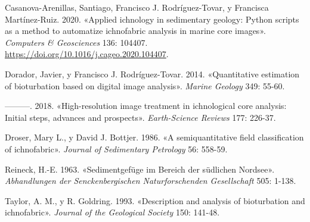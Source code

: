 \documentclass[
  10pt,
]{article}
\newlength{\cslhangindent}
\newlength{\cslentryspacingunit} %
\newenvironment{CSLReferences}[2] %
 {%
  \setlength{\parindent}{0pt}
  \ifodd #1
  \let\oldpar\par
  \def\par{\hangindent=\cslhangindent\oldpar}
  \fi
  \setlength{\parskip}{#2\cslentryspacingunit}
 }%
 {}
\begin{document}
\hypertarget{refs}{}
\begin{CSLReferences}{1}{0}
\leavevmode{}%
Casanova-Arenillas, Santiago, Francisco J. Rodríguez-Tovar, y Francisca
Martínez-Ruiz. 2020. {«Applied ichnology in sedimentary geology: Python
scripts as a method to automatize ichnofabric analysis in marine core
images»}. \emph{Computers \& Geosciences} 136: 104407.
\url{https://doi.org/10.1016/j.cageo.2020.104407}.

\leavevmode{}%
Dorador, Javier, y Francisco J. Rodríguez-Tovar. 2014. {«Quantitative
estimation of bioturbation based on digital image analysis»}.
\emph{Marine Geology} 349: 55-60.

\leavevmode{}%
---------. 2018. {«High-resolution image treatment in ichnological core
analysis: Initial steps, advances and prospects»}. \emph{Earth-Science
Reviews} 177: 226-37.

\leavevmode{}%
Droser, Mary L., y David J. Bottjer. 1986. {«A semiquantitative field
classification of ichnofabric»}. \emph{Journal of Sedimentary Petrology}
56: 558-59.

\leavevmode{}%
Reineck, H.-E. 1963. {«Sedimentgef{ü}ge im Bereich der s{ü}dlichen
Nordsee»}. \emph{Abhandlungen der Senckenbergischen Naturforschenden
Gesellschaft} 505: 1-138.

\leavevmode{}%
Taylor, A. M., y R. Goldring. 1993. {«Description and analysis of
bioturbation and ichnofabric»}. \emph{Journal of the Geological Society}
150: 141-48.

\end{CSLReferences}
\end{document}
